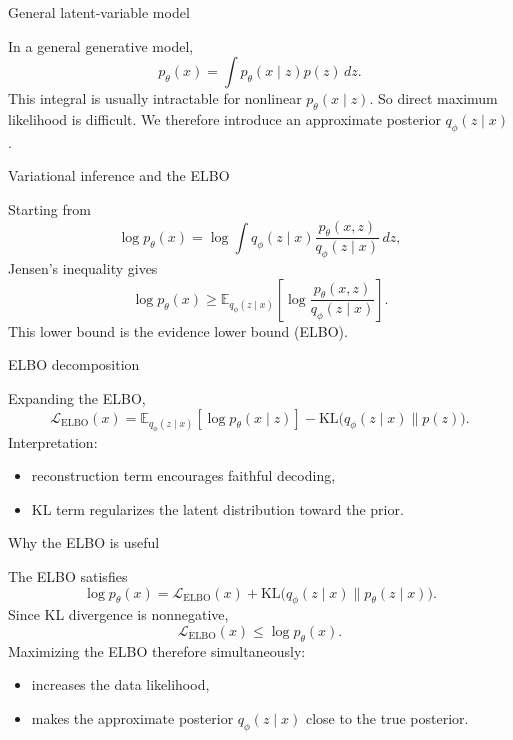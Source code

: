\documentclass[aspectratio=169]{beamer}
\begin{document}
\begin{frame}{General latent-variable model}

In a general generative model,
\[
p_\theta(x)=\int p_\theta(x\mid z)p(z)\,dz.
\]
This integral is usually intractable for nonlinear \(p_\theta(x\mid z)\).
So direct maximum likelihood is difficult.
We therefore introduce an approximate posterior \(q_\phi(z\mid x)\).

\end{frame}

\begin{frame}{Variational inference and the ELBO}

Starting from
\[
\log p_\theta(x)
=
\log \int q_\phi(z\mid x)\frac{p_\theta(x,z)}{q_\phi(z\mid x)}\,dz,
\]
Jensen's inequality gives
\[
\log p_\theta(x)
\ge
\mathbb{E}_{q_\phi(z\mid x)}
\left[
\log \frac{p_\theta(x,z)}{q_\phi(z\mid x)}
\right].
\]
This lower bound is the evidence lower bound (ELBO).

\end{frame}

\begin{frame}{ELBO decomposition}

Expanding the ELBO,
\[
\mathcal{L}_{\mathrm{ELBO}}(x)
=
\mathbb{E}_{q_\phi(z\mid x)}[\log p_\theta(x\mid z)]
-
\mathrm{KL}\bigl(q_\phi(z\mid x)\|p(z)\bigr).
\]
Interpretation:
\begin{itemize}
\item reconstruction term encourages faithful decoding,
\item KL term regularizes the latent distribution toward the prior.
\end{itemize}

\end{frame}

\begin{frame}{Why the ELBO is useful}

The ELBO satisfies
\[
\log p_\theta(x)
=
\mathcal{L}_{\mathrm{ELBO}}(x)
+
\mathrm{KL}\bigl(q_\phi(z\mid x)\|p_\theta(z\mid x)\bigr).
\]
Since KL divergence is nonnegative,
\[
\mathcal{L}_{\mathrm{ELBO}}(x)\le \log p_\theta(x).
\]
Maximizing the ELBO therefore simultaneously:
\begin{itemize}
\item increases the data likelihood,
\item makes the approximate posterior \(q_\phi(z\mid x)\) close to the true posterior.
\end{itemize}

\end{frame}
\end{document}
